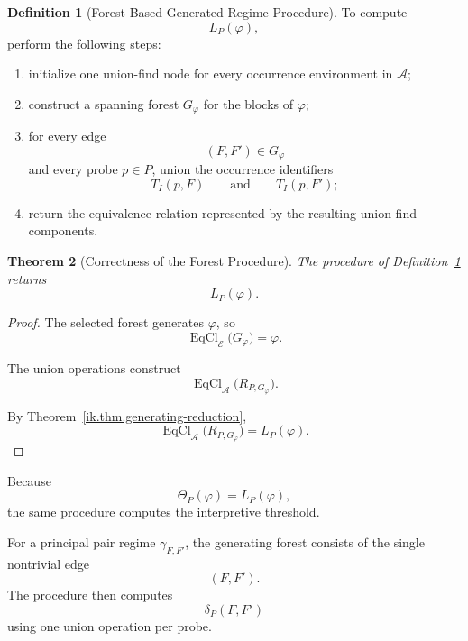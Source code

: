 \documentclass[11pt]{article}
\theoremstyle{plain}
\newtheorem{theorem}{Theorem}[section]
\theoremstyle{definition}
\newtheorem{definition}[theorem]{Definition}
\theoremstyle{remark}
\begin{document}
\begin{definition}[Forest-Based Generated-Regime Procedure]
  \label{ik.def.forest-procedure}
  To compute
  \[
    L_P(\varphi),
  \]
  perform the following steps:
  \begin{enumerate}[label=(\arabic*)]
    \item initialize one union-find node
          for every occurrence environment
          in \(\mathcal{A}\);
    \item construct a spanning forest
          \(G_{\varphi}\)
          for the blocks of \(\varphi\);
    \item for every edge
          \[
            (F,F')
            \in
            G_{\varphi}
          \]
          and every probe \(p\in P\),
          union the occurrence identifiers
          \[
            T_I(p,F)
            \qquad\text{and}\qquad
            T_I(p,F');
          \]
    \item return the equivalence relation
          represented by the resulting
          union-find components.
  \end{enumerate}
\end{definition}

\begin{theorem}[Correctness of the Forest Procedure]
  \label{ik.thm.forest-procedure}
  The procedure of
  Definition~\ref{ik.def.forest-procedure}
  returns
  \[
    L_P(\varphi).
  \]
\end{theorem}

\begin{proof}
  The selected forest generates \(\varphi\), so
  \[
    \operatorname{EqCl}_{\mathcal{E}}
    \bigl(
    G_{\varphi}
    \bigr)
    =
    \varphi.
  \]

  The union operations construct
  \[
    \operatorname{EqCl}_{\mathcal{A}}
    \bigl(
    R_{P,G_{\varphi}}
    \bigr).
  \]

  By Theorem~\ref{ik.thm.generating-reduction},
  \[
    \operatorname{EqCl}_{\mathcal{A}}
    \bigl(
    R_{P,G_{\varphi}}
    \bigr)
    =
    L_P(\varphi).
  \]
\end{proof}

Because
\[
  \Theta_P(\varphi)
  =
  L_P(\varphi),
\]
the same procedure computes
the interpretive threshold.

For a principal pair regime
\(\gamma_{F,F'}\),
the generating forest consists of
the single nontrivial edge
\[
  (F,F').
\]
The procedure then computes
\[
  \delta_P(F,F')
\]
using one union operation per probe.
\end{document}
